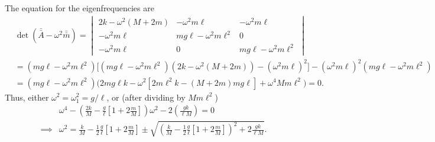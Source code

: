 \documentclass{article}
\begin{document}
    The equation for the eigenfrequencies are 
    \begin{align*} 
        & \det(\bar {\bar A} - \omega^2\bar {\bar m}) = 
        \begin{vmatrix}
            2k - \omega^2(M + 2m) & -\omega^2m\ell & - \omega^2m \ell \\
            -\omega^2m\ell & mg\ell - \omega^2m\ell^2 & 0 \\
            -\omega^2m\ell & 0 & mg\ell - \omega^2m\ell^2
        \end{vmatrix}
         \\
        & = (mg\ell - \omega^2m\ell^2) \Big[(mg\ell - \omega^2m\ell^2)(2k - \omega^2(M + 2m)) - (\omega^2m \ell)^2\Big] 
        - (\omega^2m\ell)^2 \left(mg\ell - \omega^2m\ell^2\right) \\ 
        & = (mg\ell - \omega^2m\ell^2) \bigg(2mg\ell k  - \omega^2[2m\ell^2k - (M + 2m)mg\ell] + \omega^4Mm\ell^2 \bigg) = 0.
    \end{align*}
    Thus, either $\omega^2 = \omega_1^2 = g/\ell$, or (after dividing by $Mm\ell^2$)
    \begin{align*}
        & \omega^4 - \left(\frac{2k}{M} - \frac{g}{\ell}\left[1 + 2 \frac{m}{M}\right]\right) \omega^2- 2\left(\frac{gk}{\ell M}\right) = 0\\
        \implies  &\omega^2 = \frac{k}{M} - \frac{1}{2}\frac{g}{\ell}\left[1 + 2 \frac{m}{M}\right]\pm \sqrt{\left(\frac{k}{M} - \frac{1}{2}\frac{g}{\ell}\left[1 + 2 \frac{m}{M}\right]\right)^2 + 2 \frac{gk}{\ell M}}.
    \end{align*}
\end{document}
